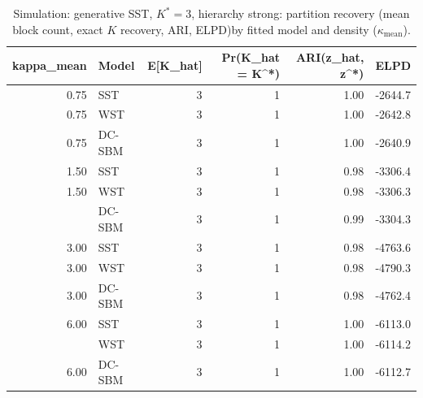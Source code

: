 \begin{table}
\centering
\caption{Simulation: generative SST, $K^*=3$, hierarchy strong: partition recovery (mean block count, exact $K$ recovery, ARI, ELPD)by fitted model and density ($\kappa_{\text{mean}}$).}
\centering
\begin{tabular}[t]{rlrrrr}
\toprule
kappa_mean & Model & E[K_hat] & Pr(K_hat = K^*) & ARI(z_hat, z^*) & ELPD\\
\midrule
0.75 & SST & 3 & 1 & 1.00 & -2644.7\\
0.75 & WST & 3 & 1 & 1.00 & -2642.8\\
0.75 & DC-SBM & 3 & 1 & 1.00 & -2640.9\\
1.50 & SST & 3 & 1 & 0.98 & -3306.4\\
1.50 & WST & 3 & 1 & 0.98 & -3306.3\\
\addlinespace
1.50 & DC-SBM & 3 & 1 & 0.99 & -3304.3\\
3.00 & SST & 3 & 1 & 0.98 & -4763.6\\
3.00 & WST & 3 & 1 & 0.98 & -4790.3\\
3.00 & DC-SBM & 3 & 1 & 0.98 & -4762.4\\
6.00 & SST & 3 & 1 & 1.00 & -6113.0\\
\addlinespace
6.00 & WST & 3 & 1 & 1.00 & -6114.2\\
6.00 & DC-SBM & 3 & 1 & 1.00 & -6112.7\\
\bottomrule
\end{tabular}
\end{table}
